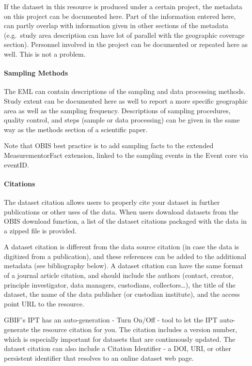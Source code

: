 \documentclass[
  letterpaper,
  DIV=11,
  numbers=noendperiod,
  oneside]{scrreprt}
\let\oldparagraph\paragraph
\renewcommand{\paragraph}[1]{\oldparagraph{#1}\mbox{}}
\begin{document}
If the dataset in this resource is produced under a certain project, the
metadata on this project can be documented here. Part of the information
entered here, can partly overlap with information given in other
sections of the metadata (e.g.~study area description can have lot of
parallel with the geographic coverage section). Personnel involved in
the project can be documented or repeated here as well. This is not a
problem.

\hypertarget{sampling-methods}{%
\paragraph{Sampling Methods}\label{sampling-methods}}

The EML can contain descriptions of the sampling and data processing
methods. Study extent can be documented here as well to report a more
specific geographic area as well as the sampling frequency. Descriptions
of sampling procedures, quality control, and steps (sample or data
processing) can be given in the same way as the methods section of a
scientific paper.

Note that OBIS best practice is to add sampling facts to the extended
MeasurementorFact extension, linked to the sampling events in the Event
core via eventID.

\hypertarget{citations}{%
\paragraph{Citations}\label{citations}}

The dataset citation allows users to properly cite your dataset in
further publications or other uses of the data. When users download
datasets from the OBIS download function, a list of the dataset
citations packaged with the data in a zipped file is provided.

A dataset citation is different from the data source citation (in case
the data is digitized from a publication), and these references can be
added to the additional metadata (see bibliography below). A dataset
citation can have the same format of a journal article citation, and
should include the authors (contact, creator, principle investigator,
data managers, custodians, collectors\ldots), the title of the dataset,
the name of the data publisher (or custodian institute), and the access
point URL to the resource.

GBIF's IPT has an auto-generation - Turn On/Off - tool to let the IPT
auto-generate the resource citation for you. The citation includes a
version number, which is especially important for datasets that are
continuously updated. The dataset citation can also include a Citation
Identifier - a DOI, URI, or other persistent identifier that resolves to
an online dataset web page.
\end{document}
